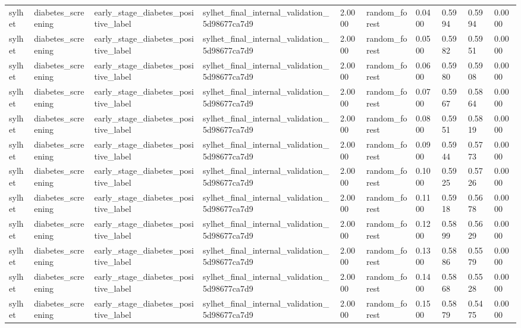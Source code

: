 \begin{tabular}{llllllllll}
sylhet & diabetes\_screening & early\_stage\_diabetes\_positive\_label & sylhet\_final\_internal\_validation\_5d98677ca7d9 & 2.0000 & random\_forest & 0.0400 & 0.5994 & 0.5994 & 0.0000 \\
sylhet & diabetes\_screening & early\_stage\_diabetes\_positive\_label & sylhet\_final\_internal\_validation\_5d98677ca7d9 & 2.0000 & random\_forest & 0.0500 & 0.5982 & 0.5951 & 0.0000 \\
sylhet & diabetes\_screening & early\_stage\_diabetes\_positive\_label & sylhet\_final\_internal\_validation\_5d98677ca7d9 & 2.0000 & random\_forest & 0.0600 & 0.5980 & 0.5908 & 0.0000 \\
sylhet & diabetes\_screening & early\_stage\_diabetes\_positive\_label & sylhet\_final\_internal\_validation\_5d98677ca7d9 & 2.0000 & random\_forest & 0.0700 & 0.5967 & 0.5864 & 0.0000 \\
sylhet & diabetes\_screening & early\_stage\_diabetes\_positive\_label & sylhet\_final\_internal\_validation\_5d98677ca7d9 & 2.0000 & random\_forest & 0.0800 & 0.5951 & 0.5819 & 0.0000 \\
sylhet & diabetes\_screening & early\_stage\_diabetes\_positive\_label & sylhet\_final\_internal\_validation\_5d98677ca7d9 & 2.0000 & random\_forest & 0.0900 & 0.5944 & 0.5773 & 0.0000 \\
sylhet & diabetes\_screening & early\_stage\_diabetes\_positive\_label & sylhet\_final\_internal\_validation\_5d98677ca7d9 & 2.0000 & random\_forest & 0.1000 & 0.5925 & 0.5726 & 0.0000 \\
sylhet & diabetes\_screening & early\_stage\_diabetes\_positive\_label & sylhet\_final\_internal\_validation\_5d98677ca7d9 & 2.0000 & random\_forest & 0.1100 & 0.5918 & 0.5678 & 0.0000 \\
sylhet & diabetes\_screening & early\_stage\_diabetes\_positive\_label & sylhet\_final\_internal\_validation\_5d98677ca7d9 & 2.0000 & random\_forest & 0.1200 & 0.5899 & 0.5629 & 0.0000 \\
sylhet & diabetes\_screening & early\_stage\_diabetes\_positive\_label & sylhet\_final\_internal\_validation\_5d98677ca7d9 & 2.0000 & random\_forest & 0.1300 & 0.5886 & 0.5579 & 0.0000 \\
sylhet & diabetes\_screening & early\_stage\_diabetes\_positive\_label & sylhet\_final\_internal\_validation\_5d98677ca7d9 & 2.0000 & random\_forest & 0.1400 & 0.5868 & 0.5528 & 0.0000 \\
sylhet & diabetes\_screening & early\_stage\_diabetes\_positive\_label & sylhet\_final\_internal\_validation\_5d98677ca7d9 & 2.0000 & random\_forest & 0.1500 & 0.5879 & 0.5475 & 0.0000 \\

\end{tabular}

